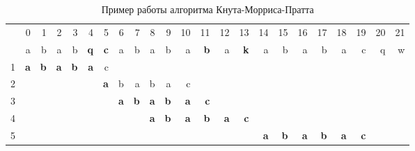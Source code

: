 \documentclass[a4paper,12pt]{article}
\begin{document}
\begin{table} [h!]
	\begin{center}
		\caption{Пример работы алгоритма Кнута-Морриса-Пратта}
		\begin{tabular}{|rrrrrrrrrrrrrrrrrrrrrrr|}
			\hline
			&          0 &          1 &          2 &          3 &          4 &          5 &          6 &          7 &          8 &          9 &         10 &         11 &         12 &         13 &         14 &         15 &         16 &         17 &         18 &         19 &         20 &         21 \\
			
			&          a &          b &          a &          b &    {\bf q} &    {\bf c} &          a &          b &          a &          b &          a &    {\bf b} &          a &    {\bf k} &          a &          b &          a &          b &          a &          c &          q &          w \\
			
			1 &    {\bf a} &    {\bf b} &    {\bf a} &    {\bf b} &    {\bf a} &          c &            &            &            &            &            &            &            &            &            &            &            &            &            &            &            &            \\
			
			2 &            &            &            &            &            &    {\bf a} &          b &          a &          b &          a &          c &            &            &            &            &            &            &            &            &            &            &            \\
			
			3 &            &            &            &            &            &            &    {\bf a} &    {\bf b} &    {\bf a} &    {\bf b} &    {\bf a} &    {\bf c} &            &            &            &            &            &            &            &            &            &            \\
			
			4 &            &            &            &            &            &            &            &            &    {\bf a} &    {\bf b} &    {\bf a} &    {\bf b} &    {\bf a} &    {\bf c} &            &            &            &            &            &            &            &            \\
			
			5 &            &            &            &            &            &            &            &            &            &            &            &            &            &            &    {\bf a} &    {\bf b} &    {\bf a} &    {\bf b} &    {\bf a} &    {\bf c} &            &            \\
			\hline
		\end{tabular}  
		\label{kmp_cmp}
	\end{center}
\end{table}
\end{document}
